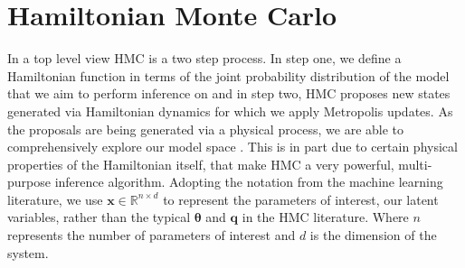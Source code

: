 \section{Hamiltonian Monte Carlo}
\label{sec:hmc}
In a top level view HMC is a two step process. In step one, we define a Hamiltonian function in terms of the joint probability distribution of the model that we aim to perform inference on and in step two, HMC proposes new states generated via Hamiltonian dynamics for which we apply Metropolis updates. As the proposals are being generated via a physical process, we are able to comprehensively explore our model space \citep{neal2011mcmc}. This is in part due to certain physical properties of the Hamiltonian itself, that make HMC a very powerful, multi-purpose inference algorithm. Adopting the notation from the machine learning literature, we use $\textbf{x} \in \mathbb{R}^{n \times d}$ to represent the parameters of interest, our latent variables, rather than the typical $\mathbf{\theta}$ and $\textbf{q}$ in the HMC literature. Where $n$ represents the number of parameters of interest and $d$ is the dimension of the system.

